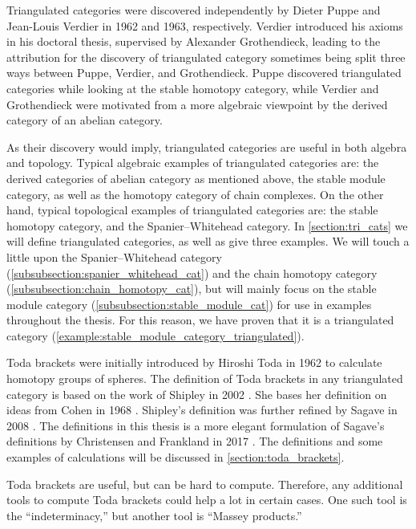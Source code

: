Triangulated categories were discovered independently by Dieter Puppe and Jean-Louis Verdier in 1962 and 1963, respectively. Verdier introduced his axioms in his doctoral thesis, supervised by Alexander Grothendieck, leading to the attribution for the discovery of triangulated category sometimes being split three ways between Puppe, Verdier, and Grothendieck. Puppe discovered triangulated categories while looking at the stable homotopy category, while Verdier and Grothendieck were motivated from a more algebraic viewpoint by the derived category of an abelian category.

As their discovery would imply, triangulated categories are useful in both algebra and topology. Typical algebraic examples of triangulated categories are: the derived categories of abelian category as mentioned above, the stable module category, as well as the homotopy category of chain complexes. On the other hand, typical topological examples of triangulated categories are: the stable homotopy category, and the Spanier--Whitehead category. In \autoref{section:tri_cats} we will define triangulated categories, as well as give three examples. We will touch a little upon the Spanier--Whitehead category (\autoref{subsubsection:spanier_whitehead_cat}) and the chain homotopy category (\autoref{subsubsection:chain_homotopy_cat}), but will mainly focus on the stable module category (\autoref{subsubsection:stable_module_cat}) for use in examples throughout the thesis. For this reason, we have proven that it is a triangulated category (\autoref{example:stable_module_category_triangulated}).

Toda brackets were initially introduced by Hiroshi Toda in 1962 to calculate homotopy groups of spheres. The definition of Toda brackets in any triangulated category is based on the work of Shipley in 2002 \cite[Definition A.2]{Shipley_2002}. She bases her definition on ideas from Cohen in 1968 \cite[p.\ 308]{Cohen_1968}. Shipley's definition was further refined by Sagave in 2008 \cite[Remark 4.5]{Sagave_2008}. The definitions in this thesis is a more elegant formulation of Sagave's definitions by Christensen and Frankland in 2017 \cite[Definition 3.1]{Christensen-Frankland_2017}. The definitions and some examples of calculations will be discussed in \autoref{section:toda_brackets}.

Toda brackets are useful, but can be hard to compute. Therefore, any additional tools to compute Toda brackets could help a lot in certain cases. One such tool is the ``indeterminacy,'' but another tool is ``Massey products.''

